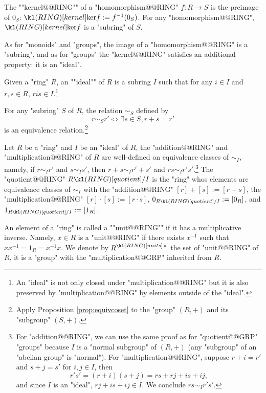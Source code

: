 \documentclass[main.tex]{subfiles}
\begin{document}
\begin{defn}[Kernel]
	\AP The ""kernel@@RING"" of a "homomorphism@@RING" $f: R \rightarrow S$ is the preimage of $0_S$: $\kerring{f} := f^{-1}(0_S)$. For any "homomorphism@@RING", $\kerring{f}$ is a "subring" of $S$.
\end{defn}
As for "monoids" and "groups", the image of a "homomorphism@@RING" is a "subring", and as for "groups" the "kernel@@RING" satisfies an additional property: it is an "ideal".
\begin{defn}[Ideal]
	\AP Given a "ring" $R$, an ""ideal"" of $R$ is a subring $I$ such that for any $i \in I$ and $r,s \in R$, $ris \in I$.\footnote{An "ideal" is not only closed under "multiplication@@RING" but it is also preserved by "multiplication@@RING" by elements outside of the "ideal".}
\end{defn}
\begin{prop}
	For any "subring" $S$ of $R$, the relation $\sim_S$ defined by 
	\[r \sim_S r' \Leftrightarrow \exists s \in S, r+s = r'\]
	is an equivalence relation.\footnote{Apply Proposition \ref{prop:equivcoset} to the "group" $(R,+)$ and its "subgroup" $(S,+)$.}
\end{prop}
\begin{defn}[Quotient]
	Let $R$ be a "ring" and $I$ be an "ideal" of $R$, the "addition@@RING" and "multiplication@@RING" of $R$ are well-defined on equivalence classes of $\sim_I$, namely, if $r \sim_I r'$ and $s \sim_I s'$, then $r+s \sim_I r'+s'$ and $rs \sim_I r's'$.\footnote{For "addition@@RING", we can use the same proof as for "quotient@@GRP" "groups" because $I$ is a "normal subgroup" of $(R,+)$ (any "subgroup" of an "abelian group" is "normal"). For "multiplication@@RING", suppose $r+i = r'$ and $s+j = s'$ for $i,j \in I$, then \[r's' = (r+i)(s+j) = rs+rj+is+ij,\] and since $I$ is an "ideal", $rj+is+ij \in I$. We conclude $rs \sim_I r's'$.} \AP The "quotient@@RING" $\quotRING{R}{I}$ is the "ring" whos elements are equivalence classes of $\sim_I$ with the "addition@@RING" $[r]+[s] := [r+s]$, the "multiplication@@RING" $[r]\cdot [s] :=  [r\cdot s]$, $0_{\quotRING{R}{I}} := [0_R]$, and $1_{\quotRING{R}{I}} := [1_R]$.
\end{defn}
\begin{defn}[Units]
	\AP An element of a "ring" is called a ""unit@@RING"" if it has a multiplicative inverse. Namely, $x \in R$ is a "unit@@RING" if there exists $x^{-1}$ such that $xx^{-1} = 1_R = x^{-1}x$. We denote by $\units{R}$ the set of "unit@@RING" of $R$, it is a "group" with the "multiplication@@GRP" inherited from $R$.
\end{defn}
\end{document}
